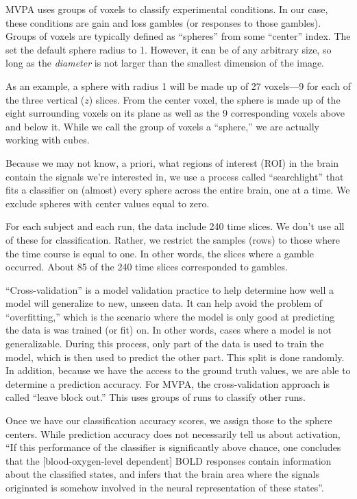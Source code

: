 \documentclass[11pt]{article}
\begin{document}
MVPA uses groups of voxels to classify experimental conditions. In our case,
these conditions are gain and loss gambles (or responses to those gambles).
Groups of voxels are typically defined as ``spheres'' from some ``center''
index. The set the default sphere radius to 1. However, it can be of any
arbitrary size, so long as the \textit{diameter} is not larger than the
smallest dimension of the image.

As an example, a sphere with radius 1 will be made up of 27 voxels---9
for each of the three vertical (\(z\)) slices. From the center voxel, the
sphere is made up of the eight surrounding voxels on its plane as well as the
9 corresponding voxels above and below it. While we call the group of voxels a
``sphere,'' we are actually working with cubes.

Because we may not know, a priori, what regions of interest (ROI) in the brain
contain the signals we're interested in, we use a process called
``searchlight'' that fits a classifier on (almost) every sphere across the
entire brain, one at a time. We exclude spheres with center values equal to
zero.

For each subject and each run, the data include 240 time slices. We don't use
all of these for classification. Rather, we restrict the samples (rows) to
those where the time course is equal to one. In other words, the slices where a
gamble occurred. About 85 of the 240 time slices corresponded to gambles.

``Cross-validation'' is a model validation practice to help determine how well
a model will generalize to new, unseen data. It can help avoid the problem of
``overfitting,'' which is the scenario where the model is only good at
predicting the data is was trained (or fit) on. In other words, cases where a
model is not generalizable. During this process, only part of the data is used
to train the model, which is then used to predict the other part. This split is
done randomly. In addition, because we have the access to the ground truth
values, we are able to determine a prediction accuracy. For MVPA, the
cross-validation approach is called ``leave block out.'' This uses groups of
runs to classify other runs.

Once we have our classification accuracy scores, we assign those to the sphere
centers. While prediction accuracy does not necessarily tell us about
activation, ``If this performance of the classifier is significantly above
chance, one concludes that the [blood-oxygen-level dependent] BOLD responses
contain information about the classified states, and infers that the brain area
where the signals originated is somehow involved in the neural representation
of these states''\cite{schreiber2013statistical}.
\end{document}
